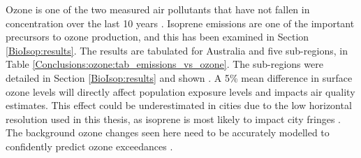   Ozone is one of the two measured air pollutants that have not fallen in concentration over the last 10 years \parencite{SOE2016}.
  Isoprene emissions are one of the important precursors to ozone production, and this has been examined in Section \ref{BioIsop:results}.
  The results are tabulated for Australia and five sub-regions, in Table \ref{Conclusions:ozone:tab_emissions_vs_ozone}.
  The sub-regions were detailed in Section \ref{BioIsop:results} and shown . 
  A 5\% mean difference in surface ozone levels will directly affect population exposure levels and impacts air quality estimates. 
  This effect could be underestimated in cities due to the low horizontal resolution used in this thesis, as isoprene is most likely to impact city fringes \parencite{Millet2016}.
  The background ozone changes seen here need to be accurately modelled to confidently predict ozone exceedances \parencite[e.g.,][]{Cope2004}.
  
